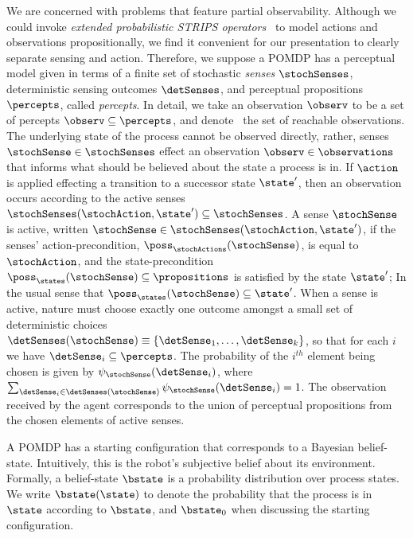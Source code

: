 
We are concerned with problems that feature partial
observability. Although we could invoke {\em extended probabilistic
STRIPS operators}~\cite{rintanen:01} to model actions and observations
propositionally, we find it convenient for our presentation to clearly
separate sensing and action. Therefore, we suppose a POMDP has a
perceptual model given in terms of a finite set of stochastic {\em
senses} $\stochSenses$, deterministic sensing outcomes $\detSenses$,
and perceptual propositions $\percepts$, called {\em percepts}. In
detail, we take an observation $\observ$ to be a set of percepts
$\observ \subseteq \percepts$, and denote \observations\ the set of
reachable observations. The underlying state of the process cannot be
observed directly, rather, senses $\stochSense \in \stochSenses$
effect an observation $\observ \in
\observations$ that informs what should be believed about the state a
process is in. If $\action$ is applied effecting a
transition to a successor state $\state'$, then an observation occurs
according to the active senses $\stochSenses(\stochAction, \state')
\subseteq \stochSenses$. A sense $\stochSense$ is active, written
$\stochSense \in \stochSenses(\stochAction, \state')$, if the senses'
action-precondition, $\poss_\stochActions(\stochSense)$, is equal to
$\stochAction$, and the state-precondition $\poss_\states(\stochSense)
\subseteq \propositions$ is satisfied by the state $\state'$; In the
usual sense that $\poss_\states(\stochSense) \subseteq \state'$.
When a sense is active, nature must choose exactly one outcome amongst
a small set of deterministic choices $\detSenses(\stochSense)
\equiv \{\detSense_1, \ldots, \detSense_k \}$, so that for each
$i$ we have $\detSense_i \subseteq \percepts$. The probability of
the $i^{th}$ element being chosen is given by
$\psi_{\stochSense}(\detSense_i)$, where $\sum_{\detSense_i \in
\detSenses(\stochSense)} \psi_{\stochSense}(\detSense_i) =
1$. The observation received by the agent corresponds to the union of
perceptual propositions from the chosen elements of active
senses.

A POMDP has a starting configuration that corresponds to a Bayesian
belief-state. Intuitively, this is the robot's subjective belief about
its environment. Formally, a belief-state $\bstate$ is a probability
distribution over process states. We write $\bstate(\state)$ to denote
the probability that the process is in $\state$ according to
$\bstate$, and $\bstate_0$ when discussing the starting
configuration. 


